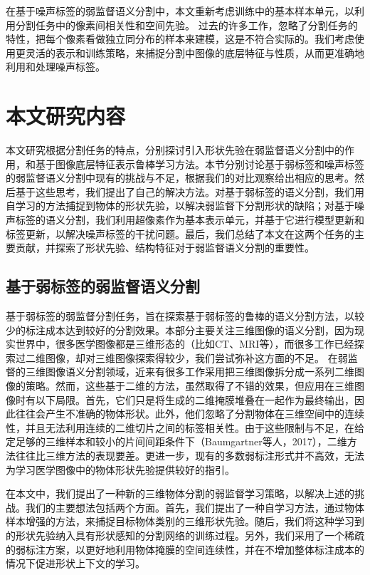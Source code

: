 在基于噪声标签的弱监督语义分割中，本文重新考虑训练中的基本样本单元，以利用分割任务中的像素间相关性和空间先验。
过去的许多工作，忽略了分割任务的特性，把每个像素看做独立同分布的样本来建模，这是不符合实际的。我们考虑使用更灵活的表示和训练策略，来捕捉分割中图像的底层特征与性质，从而更准确地利用和处理噪声标签。


\section{本文研究内容}
本文研究根据分割任务的特点，分别探讨引入形状先验在弱监督语义分割中的作用，和基于图像底层特征表示鲁棒学习方法。本节分别讨论基于弱标签和噪声标签的弱监督语义分割中现有的挑战与不足，根据我们的对比观察给出相应的思考。然后基于这些思考，我们提出了自己的解决方法。对基于弱标签的语义分割，我们用自学习的方法捕捉到物体的形状先验，以解决弱监督下分割形状的缺陷；对基于噪声标签的语义分割，我们利用超像素作为基本表示单元，并基于它进行模型更新和标签更新，以解决噪声标签的干扰问题。最后，我们总结了本文在这两个任务的主要贡献，并探索了形状先验、结构特征对于弱监督语义分割的重要性。

\subsection{基于弱标签的弱监督语义分割}
基于弱标签的弱监督分割任务，旨在探索基于弱标签的鲁棒的语义分割方法，以较少的标注成本达到较好的分割效果。本部分主要关注三维图像的语义分割，因为现实世界中，很多医学图像都是三维形态的（比如CT、MRI等），而很多工作已经探索过二维图像，却对三维图像探索得较少，我们尝试弥补这方面的不足。
在弱监督的三维图像语义分割领域，近来有很多工作采用把三维图像拆分成一系列二维图像的策略。然而，这些基于二维的方法，虽然取得了不错的效果，但应用在三维图像时有以下局限。首先，它们只是将生成的二维掩膜堆叠在一起作为最终输出，因此往往会产生不准确的物体形状\citep{kervadec2019constrained,kervadec2020bounding}。此外，他们忽略了分割物体在三维空间中的连续性，并且无法利用连续的二维切片之间的标签相关性。由于这些限制与不足，在给定足够的三维样本和较小的片间间距条件下（Baumgartner等人，2017），二维方法往往比三维方法的表现要差。更进一步，现有的多数弱标注形式并不高效，无法为学习医学图像中的物体形状先验提供较好的指引。

在本文中，我们提出了一种新的三维物体分割的弱监督学习策略，以解决上述的挑战。我们的主要想法包括两个方面。首先，我们提出了一种自学习方法，通过物体样本增强的方法，来捕捉目标物体类别的三维形状先验。随后，我们将这种学习到的形状先验纳入具有形状感知的分割网络的训练过程。另外，我们采用了一个稀疏的弱标注方案，以更好地利用物体掩膜的空间连续性，并在不增加整体标注成本的情况下促进形状上下文的学习。

